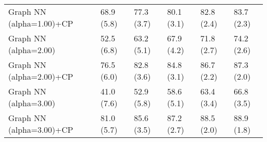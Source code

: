 \documentclass{article}
\begin{document}
\begin{table*}[t!]
\begin{center}
\begin{small}
\begin{sc}
\begin{tabular}{llllll}
Graph NN (alpha=1.00)+CP&68.9 (5.8)      &77.3 (3.7)      &80.1 (3.1)      &82.8 (2.4)      &83.7 (2.3)      \\
Graph NN (alpha=2.00)&52.5 (6.8)      &63.2 (5.1)      &67.9 (4.2)      &71.8 (2.7)      &74.2 (2.6)      \\
Graph NN (alpha=2.00)+CP&76.5 (6.0)      &82.8 (3.6)      &84.8 (3.1)      &86.7 (2.2)      &87.3 (2.0)      \\
Graph NN (alpha=3.00)&41.0 (7.6)      &52.9 (5.8)      &58.6 (5.1)      &63.4 (3.4)      &66.8 (3.5)      \\
Graph NN (alpha=3.00)+CP&81.0 (5.7)      &85.6 (3.5)      &87.2 (2.7)      &88.5 (2.0)      &88.9 (1.8)      \\
\bottomrule
\end{tabular}
\end{sc}
\end{small}
\end{center}
\vskip -0.1in
\end{table*}
\end{document}
